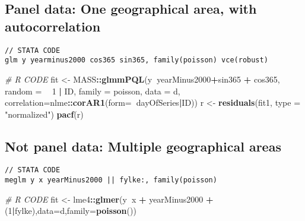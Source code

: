 \documentclass[]{book}
\newenvironment{Shaded}{\begin{snugshade}}{\end{snugshade}}
\newcommand{\KeywordTok}[1]{\textcolor[rgb]{0.13,0.29,0.53}{\textbf{#1}}}
\newcommand{\DataTypeTok}[1]{\textcolor[rgb]{0.13,0.29,0.53}{#1}}
\newcommand{\DecValTok}[1]{\textcolor[rgb]{0.00,0.00,0.81}{#1}}
\newcommand{\StringTok}[1]{\textcolor[rgb]{0.31,0.60,0.02}{#1}}
\newcommand{\CommentTok}[1]{\textcolor[rgb]{0.56,0.35,0.01}{\textit{#1}}}
\newcommand{\OperatorTok}[1]{\textcolor[rgb]{0.81,0.36,0.00}{\textbf{#1}}}
\newcommand{\NormalTok}[1]{#1}
\begin{document}
\subsection{Panel data: One geographical area, with
autocorrelation}\label{panel-data-one-geographical-area-with-autocorrelation}

\begin{verbatim}
// STATA CODE
glm y yearminus2000 cos365 sin365, family(poisson) vce(robust)
\end{verbatim}

\begin{Shaded}
\begin{Highlighting}[]
\CommentTok{# R CODE}
\NormalTok{fit <-}\StringTok{ }\NormalTok{MASS}\OperatorTok{::}\KeywordTok{glmmPQL}\NormalTok{(y}\OperatorTok{~}\NormalTok{yearMinus2000}\OperatorTok{+}\NormalTok{sin365 }\OperatorTok{+}\StringTok{ }\NormalTok{cos365, }\DataTypeTok{random =} \OperatorTok{~}\StringTok{ }\DecValTok{1} \OperatorTok{|}\StringTok{ }\NormalTok{ID,}
                \DataTypeTok{family =}\NormalTok{ poisson, }\DataTypeTok{data =}\NormalTok{ d,}
                \DataTypeTok{correlation=}\NormalTok{nlme}\OperatorTok{::}\KeywordTok{corAR1}\NormalTok{(}\DataTypeTok{form=}\OperatorTok{~}\NormalTok{dayOfSeries}\OperatorTok{|}\NormalTok{ID))}
\NormalTok{r <-}\StringTok{ }\KeywordTok{residuals}\NormalTok{(fit1, }\DataTypeTok{type =} \StringTok{"normalized"}\NormalTok{)}
\KeywordTok{pacf}\NormalTok{(r)}
\end{Highlighting}
\end{Shaded}

\subsection{Not panel data: Multiple geographical
areas}\label{not-panel-data-multiple-geographical-areas}

\begin{verbatim}
// STATA CODE
meglm y x yearMinus2000 || fylke:, family(poisson)
\end{verbatim}

\begin{Shaded}
\begin{Highlighting}[]
\CommentTok{# R CODE}
\NormalTok{fit <-}\StringTok{ }\NormalTok{lme4}\OperatorTok{::}\KeywordTok{glmer}\NormalTok{(y}\OperatorTok{~}\NormalTok{x }\OperatorTok{+}\StringTok{ }\NormalTok{yearMinus2000 }\OperatorTok{+}\StringTok{ }\NormalTok{(}\DecValTok{1}\OperatorTok{|}\NormalTok{fylke),}\DataTypeTok{data=}\NormalTok{d,}\DataTypeTok{family=}\KeywordTok{poisson}\NormalTok{())}
\end{Highlighting}
\end{Shaded}
\end{document}
